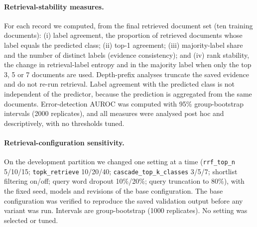 \paragraph{Retrieval-stability measures.}
For each record we computed, from the final retrieved document set (ten training documents): (i) label agreement, the proportion of retrieved documents whose label equals the predicted class; (ii) top-1 agreement; (iii) majority-label share and the number of distinct labels (evidence consistency); and (iv) rank stability, the change in retrieval-label entropy and in the majority label when only the top 3, 5 or 7 documents are used. Depth-prefix analyses truncate the saved evidence and do not re-run retrieval. Label agreement with the predicted class is not independent of the predictor, because the prediction is aggregated from the same documents. Error-detection AUROC was computed with 95\% group-bootstrap intervals (2000 replicates), and all measures were analysed post hoc and descriptively, with no thresholds tuned.
\paragraph{Retrieval-configuration sensitivity.}
On the development partition we changed one setting at a time (\texttt{rrf\_top\_n} 5/10/15; \texttt{topk\_retrieve} 10/20/40; \texttt{cascade\_top\_k\_classes} 3/5/7; shortlist filtering on/off; query word dropout 10\%/20\%; query truncation to 80\%), with the fixed seed, models and revisions of the base configuration. The base configuration was verified to reproduce the saved validation output before any variant was run. Intervals are group-bootstrap (1000 replicates). No setting was selected or tuned.
